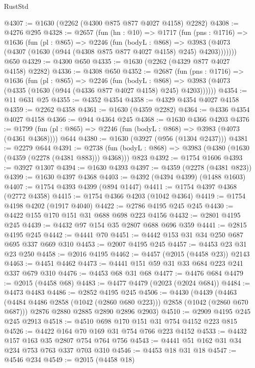 \begin{lexlean}{RustStd}
\begin{coremodule}
@4307 := @1630 (@2262 (@4300 @875 @877 @4027 @4158) @2282)
@4308 := @4276 @295
@4328 := @2657
    (fun (hn : @10) =>
    @1717
      (fun (pns : @1716) =>
      @1636
        (fun (pl : @865) =>
        @2246
          (fun (bodyL : @868) =>
          @3983 (@4073 (@4307 (@1630 (@944 (@4308 @875 @877 @4027 @4158) @245) @4203)))))))
    @650
@4329 := @4300 @650
@4335 := @1630 (@2262 (@4329 @877 @4027 @4158) @2282)
@4336 := @4308 @650
@4352 := @2687
    (fun (pns : @1716) =>
    @1636
      (fun (pl : @865) =>
      @2246
        (fun (bodyL : @868) =>
        @3983 (@4073 (@4335 (@1630 (@944 (@4336 @877 @4027 @4158) @245) @4203))))))
@4354 := @11 @631 @25
@4355 := @4352 @4354
@4358 := @4329 @4354 @4027 @4158
@4359 := @2262 @4358
@4361 := @1630 (@4359 @2282)
@4364 := @4336 @4354 @4027 @4158
@4366 := @944 @4364 @245
@4368 := @1630 @4366 @4203
@4376 := @1799 (fun (pl : @865) => @2246 (fun (bodyL : @868) => @3983 (@4073 (@4361 @4368)))) @644
@4380 := @1630 (@3927 (@956 (@1304 @2437)))
@4381 := @2279 @644
@4391 := @2738 (fun (bodyL : @868) => @3983 (@4380 (@1630 (@4359 (@2278 (@4381 @883))) @4368))) @823
@4392 := @1754 @1606
@4393 := @3927 @1307
@4394 := @1630 @4393
@4397 := @4359 (@2278 (@4381 @823))
@4399 := @1630 @4397 @4368
@4403 := @4392 (@4394 @4399) (@1488 @1603)
@4407 := @1754 @4393 @4399 (@894 @1447)
@4411 := @1754 @4397 @4368 (@2772 @4358)
@4415 := @1754 @4366 @4203 (@1042 @4364)
@4419 := @1754 @4198 @4202 (@1917 @4040)
@4422 := @2786 @4195 @245 @245
@4430 := @4422 @155 @170 @151 @31 @688 @698 @223 @4156
@4432 := @2801 @4195 @245
@4439 := @4432 @97 @154 @35 @2807 @688 @696 @359
@4441 := @2815 @4195 @245
@4442 := @4441 @70
@4451 := @4442 @153 @31 @34 @250 @687 @695 @337 @669 @310
@4453 := @2007 @4195 @245
@4457 := @4453 @23 @31 @23 @250
@4458 := @2016 @4195
@4462 := @4457 (@2015 (@4458 @23)) @2143
@4463 := @4451 @4462
@4473 := @4441 @151 @59 @31 @33 @684 @223 @241 @337 @679 @310
@4476 := @4453 @68 @31 @68
@4477 := @4476 @684
@4479 := @2015 (@4458 @68)
@4483 := @4477 @4479 (@2023 (@2024 @684))
@4484 := @4473 @4483
@4486 := @2852 @4195 @245
@4506 := @4430
    (@4439
      (@4463 (@4484 @4486 @2858 (@1042 (@2860 @680 @223))) @2858 (@1042 (@2860 @670 @687)))
      @2876
      @2880
      @2885
      @2890
      @2896
      @2903)
@4510 := @2909 @4195 @245 @245 @2913
@4518 := @4510 @698 @170 @151 @31 @754 @4152 @223 @815
@4526 := @4422 @164 @70 @169 @31 @754 @766 @223 @4152
@4533 := @4432 @157 @163 @35 @2807 @754 @764 @756
@4543 := @4441 @51 @162 @31 @34 @234 @753 @763 @337 @703 @310
@4546 := @4453 @18 @31 @18
@4547 := @4546 @234
@4549 := @2015 (@4458 @18)

\end{coremodule}
\end{lexlean}
